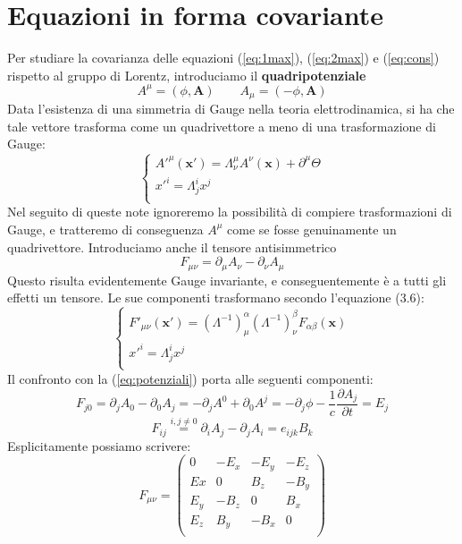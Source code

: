 \documentclass[a4paper,11pt]{book}
\theoremstyle{plain}
\theoremstyle{definition}
\begin{document}
\section{Equazioni in forma covariante}
Per studiare la covarianza delle equazioni (\ref{eq:1max}), (\ref{eq:2max}) e (\ref{eq:cons}) rispetto al gruppo di Lorentz, introduciamo il \textbf{quadripotenziale}
\begin{equation}
A^{\mu}=(\phi,\textbf{A}) \qquad A_{\mu} = (-\phi,\textbf{A})
\end{equation}
Data l'esistenza di una simmetria di Gauge nella teoria elettrodinamica, si ha che tale vettore trasforma come un quadrivettore a meno di una trasformazione di Gauge:
\[
\begin{cases}
A'^{\mu}(\textbf{x}') = \Lambda_{\nu}^{\mu}A^{\nu}(\textbf{x})+\partial^{\mu}\Theta \\
x'^{i} = \Lambda_{j}^{i} x^{j} \\
\end{cases}
\]
Nel seguito di queste note ignoreremo la possibilità di compiere trasformazioni di Gauge, e tratteremo di conseguenza $A^{\mu}$ come se fosse genuinamente un quadrivettore. Introduciamo anche il tensore antisimmetrico
\begin{equation}
F_{\mu\nu} = \partial_{\mu}A_{\nu}-\partial_{\nu}A_{\mu}
\end{equation}
Questo risulta evidentemente Gauge invariante, e conseguentemente è a tutti gli effetti un tensore. Le sue componenti trasformano secondo l'equazione (3.6):
\[
\begin{cases}
F'_{\mu\nu}(\textbf{x}') = (\Lambda^{-1})_{\mu}^{\alpha}(\Lambda^{-1})_{\nu}^{\beta}F_{\alpha\beta}(\textbf{x}) \\
x'^{i} = \Lambda_{j}^{i} x^{j} \\
\end{cases}
\]
Il confronto con la (\ref{eq:potenziali}) porta alle seguenti componenti:
\[
F_{j0}=\partial_j A_0 -\partial_0A_j = -\partial_j A^0 +\partial_0 A^j=-\partial_j\phi -\frac{1}{c}\frac{\partial A_j}{\partial t}=E_j
\]
\[
F_{ij}\overset{i,j\not=0}{=} \partial_iA_j -\partial_jA_i = e_{ijk}B_k
\]
Esplicitamente possiamo scrivere:
\[
F_{\mu\nu}=
\left( \begin{array}{cccc}
0 & -E_x & -E_y & -E_z \\
Ex & 0 & B_z & -B_y \\
E_y & -B_z & 0 & B_x \\
E_z & B_y & -B_x& 0 \\
\end{array}\right)
\]
\end{document}
